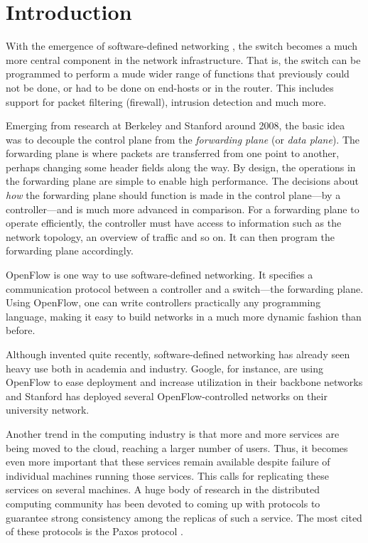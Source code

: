 \chapter{Introduction}
\label{chapter:introduction}

With the emergence of software-defined networking
\cite{Casado:2005:VNS:1047344.1047383}, the switch becomes a much
more central component in the network infrastructure.
%
That is, the switch can be programmed to perform a mude wider range of
functions that previously could not be done, or had to be done on end-hosts
or in the router.
%
This includes support for packet filtering (firewall), intrusion detection
and much more.

Emerging from research at Berkeley and
Stanford around 2008, the basic idea was to decouple the
control plane from the \textit{forwarding plane} (or
\textit{data plane}).
%
The forwarding plane is where packets are transferred from one point to
another, perhaps changing some header fields along the way.
%
By design, the operations in the forwarding plane are simple to enable high
performance.
%
The decisions about \textit{how} the forwarding plane should function is
made in the control plane---by a controller---and is much more advanced in
comparison.
%
For a forwarding plane to operate efficiently, the controller must have
access to information such as the network topology, an overview of traffic
and so on.  It can then program the forwarding plane accordingly.

OpenFlow \cite{openflow-1.0} is one way to use software-defined
networking.  It specifies a communication protocol between a controller and
a switch---the forwarding plane.
Using OpenFlow, one can write controllers practically any programming
language, making it easy to build networks in a much more dynamic fashion
than before.

Although invented quite recently, software-defined networking has already
seen heavy use both in academia and industry.
%
Google, for instance, are
using OpenFlow to ease deployment and increase utilization in their backbone
networks \cite{crabbe2012sdn} and Stanford has deployed several
OpenFlow-controlled networks on their university network.

Another trend in the computing industry is that more and more services are
being moved to the cloud, reaching a larger number of users.
%
Thus, it becomes even more important that these services remain available
despite failure of individual machines running those services.
%
This calls for replicating these services on several machines.
%
A huge body of research in the distributed computing community has been
devoted to coming up with protocols to guarantee strong consistency among
the replicas of such a service.
%
The most cited of these protocols is the Paxos protocol
\cite{Lam01,Lamport:1998:PP:279227.279229}.

